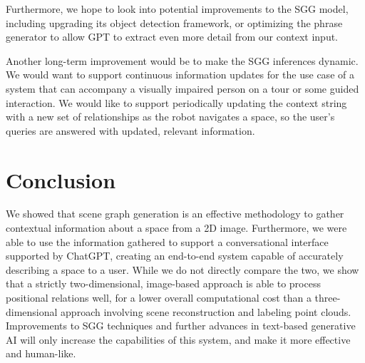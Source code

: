 \documentclass[letterpaper, 10 pt, conference]{ieeeconf}  %
\begin{document}
    Furthermore, we hope to look into potential improvements to the SGG model, including upgrading its object detection framework, or optimizing the phrase generator to allow GPT to extract even more detail from our context input.

    Another long-term improvement would be to make the SGG inferences dynamic. We would want to support continuous information updates for the use case of a system that can accompany a visually impaired person on a tour or some guided interaction. We would like to support periodically updating the context string with a new set of relationships as the robot navigates a space, so the user's queries are answered with updated, relevant information.

\section{Conclusion}
    We showed that scene graph generation is an effective methodology to gather contextual information about a space from a 2D image. Furthermore, we were able to use the information gathered to support a conversational interface supported by ChatGPT, creating an end-to-end system capable of accurately describing a space to a user. While we do not directly compare the two, we show that a strictly two-dimensional, image-based approach is able to process positional relations well, for a lower overall computational cost than a three-dimensional approach involving scene reconstruction and labeling point clouds. Improvements to SGG techniques and further advances in text-based generative AI will only increase the capabilities of this system, and make it more effective and human-like. 
    



\end{document}
